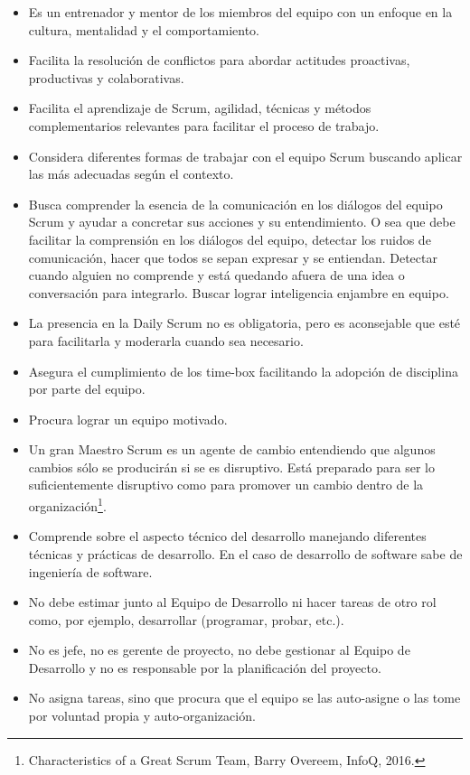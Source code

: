 \begin{itemize}
\item Es un entrenador y mentor de los miembros del equipo con un enfoque en la cultura, mentalidad y el comportamiento.
\item Facilita la resolución de conflictos para abordar actitudes proactivas, productivas y colaborativas.
\item Facilita el aprendizaje de Scrum, agilidad, técnicas y métodos complementarios relevantes para facilitar el proceso de trabajo.
\item Considera diferentes formas de trabajar con el equipo Scrum buscando aplicar las más adecuadas según el contexto.
\item Busca comprender la esencia de la comunicación en los diálogos del equipo Scrum y ayudar a concretar sus acciones y su entendimiento. O sea que debe facilitar la comprensión en los diálogos del equipo, detectar los ruidos de comunicación, hacer que todos se sepan expresar y se entiendan. Detectar cuando alguien no comprende y está quedando afuera de una idea o conversación para integrarlo. Buscar lograr inteligencia enjambre en equipo. 
\item La presencia en la Daily Scrum no es obligatoria, pero es aconsejable que esté para facilitarla y moderarla cuando sea necesario.
\item Asegura el cumplimiento de los time-box facilitando la adopción de disciplina por parte del equipo.
\item Procura lograr un equipo motivado.
\item Un gran Maestro Scrum es un agente de cambio entendiendo que algunos cambios sólo se producirán si se es disruptivo. Está preparado para ser lo suficientemente disruptivo como para promover un cambio dentro de la organización\footnote{Characteristics of a Great Scrum Team, Barry Overeem, InfoQ, 2016.}.
\item Comprende sobre el aspecto técnico del desarrollo manejando diferentes técnicas y prácticas de desarrollo. En el caso de desarrollo de software sabe de ingeniería de software.
\item No debe estimar junto al Equipo de Desarrollo ni hacer tareas de otro rol como, por ejemplo, desarrollar (programar, probar, etc.).
\item No es jefe, no es gerente de proyecto, no debe gestionar al Equipo de Desarrollo y no es responsable por la planificación del proyecto.
\item No asigna tareas, sino que procura que el equipo se las auto-asigne o las tome por voluntad propia y auto-organización.
\end{itemize}

